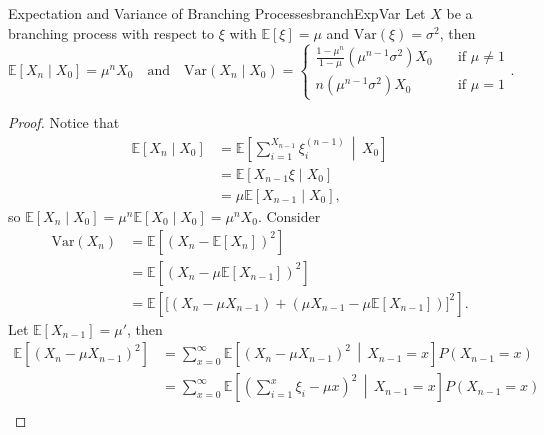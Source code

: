 \documentclass[math, code]{amznotes}
\theoremstyle{remark}
\begin{document}
\begin{probox}{Expectation and Variance of Branching Processes}{branchExpVar}
    Let $X$ be a branching process with respect to $\xi$ with $\mathbb{E}\left[\xi\right] = \mu$ and $\mathrm{Var}\left(\xi\right) = \sigma^2$, then
    \begin{equation*}
        \mathbb{E}\left[X_n \mid X_0\right] = \mu^nX_0 \quad\textrm{and}\quad \mathrm{Var}\left(X_n \mid X_0\right) = \begin{cases}
            \frac{1 - \mu^n}{1 - \mu}\left(\mu^{n - 1}\sigma^2\right)X_0 & \quad\textrm{if } \mu \neq 1 \\
            n\left(\mu^{n - 1}\sigma^2\right)X_0 & \quad\textrm{if } \mu = 1
        \end{cases}.
    \end{equation*}
    \tcblower
    \begin{proof}
        Notice that 
        \begin{align*}
            \mathbb{E}\left[X_n \mid X_0\right] & = \mathbb{E}\left[\sum_{i = 1}^{X_{n - 1}}\xi_i^{(n - 1)} \,\middle\vert\, X_0\right] \\
            & = \mathbb{E}\left[X_{n - 1}\xi \mid X_0\right] \\
            & = \mu\mathbb{E}\left[X_{n - 1} \mid X_0\right],
        \end{align*}
        so $\mathbb{E}\left[X_n \mid X_0\right] = \mu^{n}\mathbb{E}\left[X_0 \mid X_0\right] = \mu^nX_0$. Consider 
        \begin{align*}
            \mathrm{Var}\left(X_n\right) & = \mathbb{E}\left[\left(X_n - \mathbb{E}\left[X_n\right]\right)^2\right] \\
            & = \mathbb{E}\left[\left(X_n - \mu\mathbb{E}\left[X_{n - 1}\right]\right)^2\right] \\
            & = \mathbb{E}\left[\bigl[\left(X_n - \mu X_{n - 1}\right) + \left(\mu X_{n - 1} - \mu\mathbb{E}\left[X_{n - 1}\right]\right)\bigr]^2\right]. 
        \end{align*}
        Let $\mathbb{E}\left[X_{n - 1}\right] = \mu'$, then 
        \begin{align*}
            \mathbb{E}\left[\left(X_n - \mu X_{n - 1}\right)^2\right] & = \sum_{x = 0}^{\infty}\mathbb{E}\left[\left(X_n - \mu X_{n - 1}\right)^2 \,\middle\vert\, X_{n - 1} = x\right]P\left(X_{n - 1} = x\right) \\
            & = \sum_{x = 0}^{\infty}\mathbb{E}\left[\left(\sum_{i = 1}^x\xi_i - \mu x\right)^2 \,\middle\vert\, X_{n - 1} = x\right]P\left(X_{n - 1} = x\right) \\

\end{align*}
\end{proof}
\end{probox}
\end{document}
